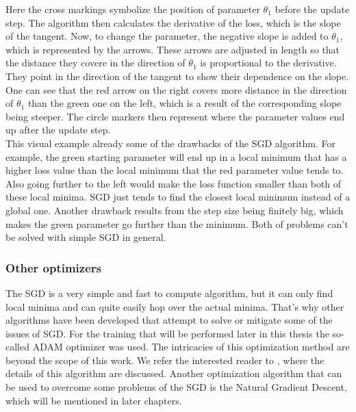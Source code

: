 Here the cross markings symbolize the position of parameter $\theta_1$ before the update step. The algorithm then calculates the derivative of the loss, which is the slope of the tangent. Now, to change the parameter, the negative slope is added to $\theta_1$, which is represented by the arrows. These arrows are adjusted in length so that the distance they covere in the direction of $\theta_1$ is proportional to the derivative. They point in the direction of the tangent to show their dependence on the slope. One can see that the red arrow on the right covers more distance in the direction of $\theta_1$ than the green one on the left, which is a result of the corresponding slope being steeper. The circle markers then represent where the parameter values end up after the update step.\\
This visual example already some of the drawbacks of the SGD algorithm. For example, the green starting parameter will end up in a local minimum that has a higher loss value than the local minimum that the red parameter value tends to. Also going further to the left would make the loss function smaller than both of these local minima. SGD just tends to find the closest local minimum instead of a global one. Another drawback results from the step size being finitely big, which makes the green parameter go further than the minimum. Both of problems can't be solved with simple SGD in general.

\subsubsection{Other optimizers}
The SGD is a very simple and fast to compute algorithm, but it can only find local minima and can quite easily hop over the actual minima. That's why other algorithms have been developed that attempt to solve or mitigate some of the issues of SGD. For the training that will be performed later in this thesis the so-called ADAM optimizer was used. The intricacies of this optimization method are beyond the scope of this work. We refer the interested reader to \cite{adamPaper}, where the details of this algorithm are discussed. Another optimization algorithm that can be used to overcome some problems of the SGD is the Natural Gradient Descent, which will be mentioned in later chapters.


